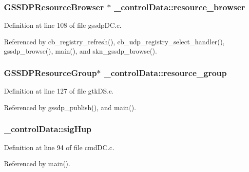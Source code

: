 \subsubsection[{resource\+\_\+browser}]{\setlength{\rightskip}{0pt plus 5cm}G\+S\+S\+D\+P\+Resource\+Browser $\ast$ \+\_\+control\+Data\+::resource\+\_\+browser}\label{struct__control_data_a796910b4ad0830538301efd69811c2c6}


Definition at line 108 of file gssdp\+D\+C.\+c.



Referenced by cb\+\_\+registry\+\_\+refresh(), cb\+\_\+udp\+\_\+registry\+\_\+select\+\_\+handler(), gssdp\+\_\+browse(), main(), and skn\+\_\+gssdp\+\_\+browse().

\hypertarget{struct__control_data_ab8684a42dc1f2e00247d7278d47046b9}{}
\subsubsection[{resource\+\_\+group}]{\setlength{\rightskip}{0pt plus 5cm}G\+S\+S\+D\+P\+Resource\+Group$\ast$ \+\_\+control\+Data\+::resource\+\_\+group}\label{struct__control_data_ab8684a42dc1f2e00247d7278d47046b9}


Definition at line 127 of file gtk\+D\+S.\+c.



Referenced by gssdp\+\_\+publish(), and main().

\hypertarget{struct__control_data_a551d0ecd4ceb9fc4ce8eebe5a984dc4c}{}
\subsubsection[{sig\+Hup}]{ \+\_\+control\+Data\+::sig\+Hup}\label{struct__control_data_a551d0ecd4ceb9fc4ce8eebe5a984dc4c}


Definition at line 94 of file cmd\+D\+C.\+c.



Referenced by main().

\hypertarget{struct__control_data_ae8ad5b5af46f4ab4bcd6ffb41e83385b}{}
